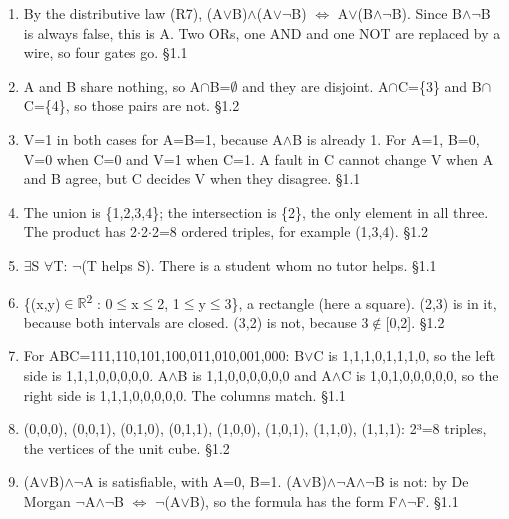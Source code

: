 \documentclass[11pt]{article}
\begin{document}
\begin{keepsection}
\begin{enumerate}
\item By the distributive law (R7), (A\ensuremath{\lor}B)\ensuremath{\land}(A\ensuremath{\lor}\ensuremath{\neg}B) \ensuremath{\Leftrightarrow} A\ensuremath{\lor}(B\ensuremath{\land}\ensuremath{\neg}B). Since B\ensuremath{\land}\ensuremath{\neg}B is always false, this is A. Two ORs, one AND and one NOT are replaced by a wire, so four gates go. \hfill{\small\color{FAUblue}§1.1}
\item A and B share nothing, so A\ensuremath{\cap}B=\ensuremath{\emptyset} and they are disjoint. A\ensuremath{\cap}C=\{3\} and B\ensuremath{\cap}C=\{4\}, so those pairs are not. \hfill{\small\color{FAUblue}§1.2}
\item V=1 in both cases for A=B=1, because A\ensuremath{\land}B is already 1. For A=1, B=0, V=0 when C=0 and V=1 when C=1. A fault in C cannot change V when A and B agree, but C decides V when they disagree. \hfill{\small\color{FAUblue}§1.1}
\item The union is \{1,2,3,4\}; the intersection is \{2\}, the only element in all three. The product has 2\ensuremath{\cdot}2\ensuremath{\cdot}2=8 ordered triples, for example (1,3,4). \hfill{\small\color{FAUblue}§1.2}
\item \ensuremath{\exists}S \ensuremath{\forall}T: \ensuremath{\neg}(T helps S). There is a student whom no tutor helps. \hfill{\small\color{FAUblue}§1.1}
\item \{(x,y)\ensuremath{\in}\ensuremath{\mathbb{R}}\textsuperscript{2} : 0\ensuremath{\leq}x\ensuremath{\leq}2, 1\ensuremath{\leq}y\ensuremath{\leq}3\}, a rectangle (here a square). (2,3) is in it, because both intervals are closed. (3,2) is not, because 3\ensuremath{\notin}[0,2]. \hfill{\small\color{FAUblue}§1.2}
\item For ABC=111,110,101,100,011,010,001,000: B\ensuremath{\lor}C is 1,1,1,0,1,1,1,0, so the left side is 1,1,1,0,0,0,0,0. A\ensuremath{\land}B is 1,1,0,0,0,0,0,0 and A\ensuremath{\land}C is 1,0,1,0,0,0,0,0, so the right side is 1,1,1,0,0,0,0,0. The columns match. \hfill{\small\color{FAUblue}§1.1}
\item (0,0,0), (0,0,1), (0,1,0), (0,1,1), (1,0,0), (1,0,1), (1,1,0), (1,1,1): 2³=8 triples, the vertices of the unit cube. \hfill{\small\color{FAUblue}§1.2}
\item (A\ensuremath{\lor}B)\ensuremath{\land}\ensuremath{\neg}A is satisfiable, with A=0, B=1. (A\ensuremath{\lor}B)\ensuremath{\land}\ensuremath{\neg}A\ensuremath{\land}\ensuremath{\neg}B is not: by De Morgan \ensuremath{\neg}A\ensuremath{\land}\ensuremath{\neg}B \ensuremath{\Leftrightarrow} \ensuremath{\neg}(A\ensuremath{\lor}B), so the formula has the form F\ensuremath{\land}\ensuremath{\neg}F. \hfill{\small\color{FAUblue}§1.1}
\end{enumerate}

\end{keepsection}
\end{document}
